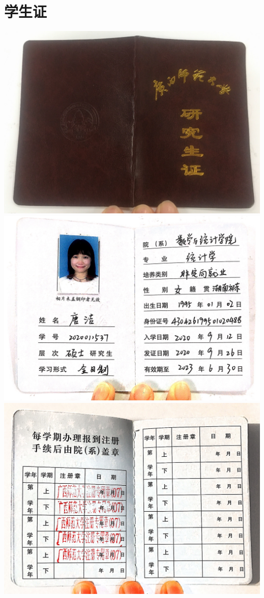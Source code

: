 \documentclass[UFT8]{ctexart}%
\begin{document}
\section{学生证}
\begin{center}
  \includegraphics[scale=0.1]{figs/学生证1.JPG }
  \includegraphics[scale=0.1]{figs/学生证2.JPG }
  \includegraphics[scale=0.1]{figs/学生证3.JPG }
\end{center}
\end{document}
